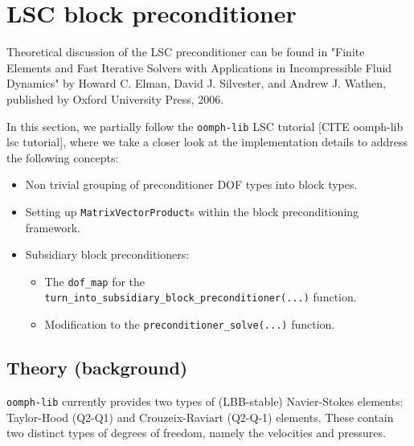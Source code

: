 \section{LSC block preconditioner\label{sec:lsc_block_preconditioner}}
Theoretical discussion of the LSC preconditioner can be found in "Finite
Elements and Fast Iterative Solvers with Applications in Incompressible Fluid
Dynamics" by Howard C. Elman, David J. Silvester, and Andrew J. Wathen,
published by Oxford University Press, 2006.

In this section, we partially follow the \texttt{oomph-lib} LSC tutorial [CITE
oomph-lib lsc tutorial], where we take a closer look at the implementation
details to address the following concepts:
\begin{itemize}
\item Non trivial grouping of preconditioner DOF types into block types.
\item Setting up \texttt{Matrix\allowbreak Vector\allowbreak Product}s within the block preconditioning framework.
\item Subsidiary block preconditioners:
 \begin{itemize}
 \item The \texttt{dof\_\allowbreak map} for the \texttt{turn\_\allowbreak into\_\allowbreak subsidiary\_\allowbreak block\_\allowbreak preconditioner(...)} function.
 \item Modification to the \texttt{preconditioner\_\allowbreak solve(...)} function.
 \end{itemize}
\end{itemize}

\subsection{Theory (background)\label{sec:lsc_theory}}
\texttt{oomph-\allowbreak lib} currently provides two types of (LBB-stable)
Navier-Stokes elements: Taylor-Hood (Q2-Q1) and Crouzeix-Raviart (Q2-Q-1)
elements. These contain two distinct types of degrees of freedom, namely the
velocities and pressures.

